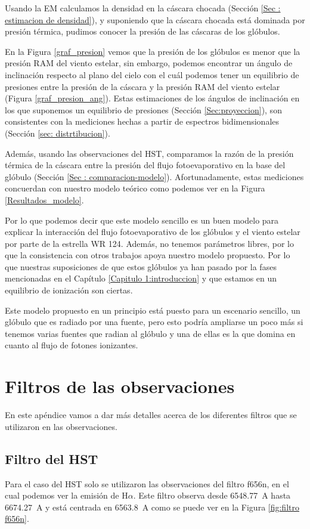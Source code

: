 \documentclass{book}
\begin{document}
Usando la EM calculamos la densidad en la cáscara chocada (Sección \ref{Sec : estimacion de densidad}), y suponiendo que la cáscara chocada está dominada por presión térmica, pudimos conocer la presión de las cáscaras de los glóbulos.

En la Figura \ref{graf_presion} vemos que la presión de los glóbulos es menor que la presión RAM del viento estelar, sin embargo, podemos encontrar un ángulo de inclinación respecto al plano del cielo con el cuál podemos tener un equilibrio de presiones entre la presión de la cáscara y la presión RAM del viento estelar (Figura \ref{graf_presion_ang}). Estas estimaciones de los ángulos de inclinación en los que suponemos un equilibrio de presiones (Sección \ref{Sec:proyeccion}), son consistentes con la mediciones hechas a partir de espectros bidimensionales (Sección \ref{sec: distrtibucion}).

Además, usando las observaciones del HST, comparamos la razón de la presión térmica de la cáscara entre la presión del flujo fotoevaporativo en la base del glóbulo (Sección \ref{Sec : comparacion-modelo}). Afortunadamente, estas mediciones concuerdan con nuestro modelo teórico como podemos ver en la Figura \ref{Resultados_modelo}.

Por lo que podemos decir que este modelo sencillo es un buen modelo para explicar la interacción del flujo fotoevaporativo de los glóbulos y el viento estelar por parte de la estrella WR 124. Además, no tenemos parámetros libres, por lo que la consistencia con otros trabajos apoya nuestro modelo propuesto. Por lo que nuestras suposiciones de que estos glóbulos ya han pasado por la fases mencionadas en el Capítulo \ref{Capitulo 1:introduccion} y que estamos en un equilibrio de ionización son ciertas. 

Este modelo propuesto en un principio está puesto para un escenario sencillo, un glóbulo que es radiado por una fuente, pero esto podría ampliarse un poco más si tenemos varias fuentes que radian al glóbulo y una de ellas es la que domina en cuanto al flujo de fotones ionizantes. 

\appendix

\chapter{Filtros de las observaciones}\label{App: Filtros}

En este apéndice vamos a dar más detalles acerca de los diferentes filtros que se utilizaron en las observaciones.
\section{Filtro del HST}
Para el caso del HST solo se utilizaron las observaciones del filtro f656n, en el cual podemos ver la emisión de H$\alpha$. Este filtro observa desde \SI{6548.77}{A} hasta \SI{6674.27}{A} y está centrada en \SI{6563.8}{A} como se puede ver en la Figura \ref{fig:filtro f656n}.
\end{document}
